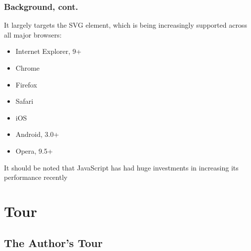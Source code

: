 \documentclass{beamer}
\begin{document}
\begin{frame}
\frametitle{Background, cont.}
It largely targets the SVG element, which is being increasingly supported across all major browsers:
\pause
    \begin{itemize}
    \item Internet Explorer, 9+
    \item Chrome
    \item Firefox
    \item Safari
    \item iOS
    \item Android, 3.0+
    \item Opera, 9.5+
    \end{itemize}
\pause
It should be noted that JavaScript has had huge investments in increasing its performance recently
\end{frame}



\section{Tour}


\subsection{The Author's Tour}
\end{document}
